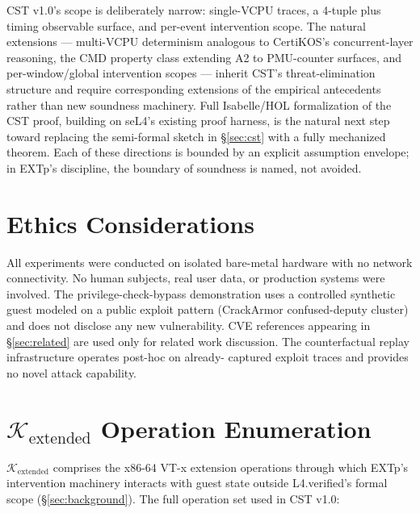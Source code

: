 \documentclass[conference]{IEEEtran}
\newcommand{\Kextended}{\mathcal{K}_\text{extended}}
\begin{document}
CST v1.0's scope is deliberately narrow: single-VCPU traces, a
4-tuple plus timing observable surface, and per-event intervention
scope. The natural extensions --- multi-VCPU determinism analogous
to CertiKOS's concurrent-layer reasoning, the CMD property class
extending A2 to PMU-counter surfaces, and per-window/global
intervention scopes --- inherit CST's threat-elimination structure
and require corresponding extensions of the empirical antecedents
rather than new soundness machinery. Full Isabelle/HOL formalization
of the CST proof, building on seL4's existing proof harness, is
the natural next step toward replacing the semi-formal sketch in
\S\ref{sec:cst} with a fully mechanized theorem. Each of these
directions is bounded by an explicit assumption envelope; in
EXTp's discipline, the boundary of soundness is named, not avoided.

\section*{Ethics Considerations}

All experiments were conducted on isolated bare-metal hardware with
no network connectivity. No human subjects, real user data, or
production systems were involved. The privilege-check-bypass
demonstration uses a controlled synthetic guest modeled on a public
exploit pattern (CrackArmor confused-deputy cluster) and does not
disclose any new vulnerability. CVE references appearing in
\S\ref{sec:related} are used only for related work discussion. The
counterfactual replay infrastructure operates post-hoc on already-
captured exploit traces and provides no novel attack capability.




\appendices

\section{$\Kextended$ Operation Enumeration}\label{app:kextended}

$\Kextended$ comprises the x86-64 VT-x extension operations
through which EXTp's intervention machinery interacts with guest
state outside L4.verified's formal scope (\S\ref{sec:background}).
The full operation set used in CST v1.0:
\end{document}

